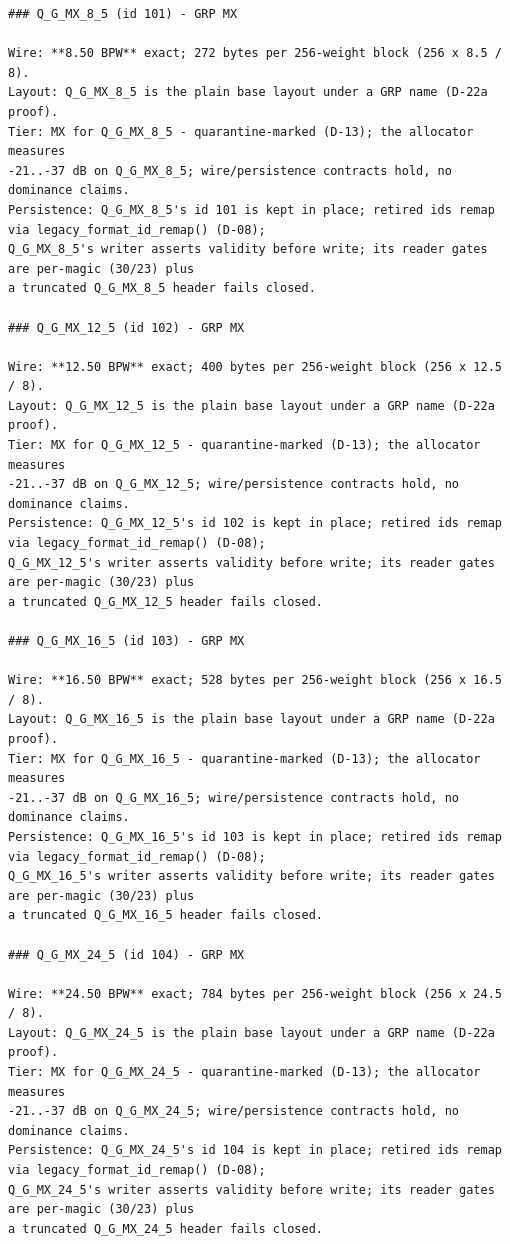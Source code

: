 \begin{Verbatim}[breaklines,breakanywhere,fontsize=\footnotesize]
### Q_G_MX_8_5 (id 101) - GRP MX

Wire: **8.50 BPW** exact; 272 bytes per 256-weight block (256 x 8.5 / 8).
Layout: Q_G_MX_8_5 is the plain base layout under a GRP name (D-22a proof).
Tier: MX for Q_G_MX_8_5 - quarantine-marked (D-13); the allocator measures
-21..-37 dB on Q_G_MX_8_5; wire/persistence contracts hold, no dominance claims.
Persistence: Q_G_MX_8_5's id 101 is kept in place; retired ids remap via legacy_format_id_remap() (D-08);
Q_G_MX_8_5's writer asserts validity before write; its reader gates are per-magic (30/23) plus
a truncated Q_G_MX_8_5 header fails closed.

### Q_G_MX_12_5 (id 102) - GRP MX

Wire: **12.50 BPW** exact; 400 bytes per 256-weight block (256 x 12.5 / 8).
Layout: Q_G_MX_12_5 is the plain base layout under a GRP name (D-22a proof).
Tier: MX for Q_G_MX_12_5 - quarantine-marked (D-13); the allocator measures
-21..-37 dB on Q_G_MX_12_5; wire/persistence contracts hold, no dominance claims.
Persistence: Q_G_MX_12_5's id 102 is kept in place; retired ids remap via legacy_format_id_remap() (D-08);
Q_G_MX_12_5's writer asserts validity before write; its reader gates are per-magic (30/23) plus
a truncated Q_G_MX_12_5 header fails closed.

### Q_G_MX_16_5 (id 103) - GRP MX

Wire: **16.50 BPW** exact; 528 bytes per 256-weight block (256 x 16.5 / 8).
Layout: Q_G_MX_16_5 is the plain base layout under a GRP name (D-22a proof).
Tier: MX for Q_G_MX_16_5 - quarantine-marked (D-13); the allocator measures
-21..-37 dB on Q_G_MX_16_5; wire/persistence contracts hold, no dominance claims.
Persistence: Q_G_MX_16_5's id 103 is kept in place; retired ids remap via legacy_format_id_remap() (D-08);
Q_G_MX_16_5's writer asserts validity before write; its reader gates are per-magic (30/23) plus
a truncated Q_G_MX_16_5 header fails closed.

### Q_G_MX_24_5 (id 104) - GRP MX

Wire: **24.50 BPW** exact; 784 bytes per 256-weight block (256 x 24.5 / 8).
Layout: Q_G_MX_24_5 is the plain base layout under a GRP name (D-22a proof).
Tier: MX for Q_G_MX_24_5 - quarantine-marked (D-13); the allocator measures
-21..-37 dB on Q_G_MX_24_5; wire/persistence contracts hold, no dominance claims.
Persistence: Q_G_MX_24_5's id 104 is kept in place; retired ids remap via legacy_format_id_remap() (D-08);
Q_G_MX_24_5's writer asserts validity before write; its reader gates are per-magic (30/23) plus
a truncated Q_G_MX_24_5 header fails closed.



\end{Verbatim}

